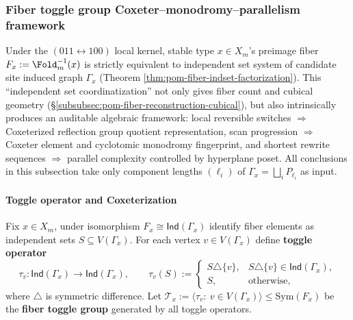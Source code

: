 \subsubsection{Fiber toggle group Coxeter--monodromy--parallelism framework}\label{subsubsec:pom-fiber-toggle-coxeter-monodromy-parallelism}
Under the \((011\leftrightarrow 100)\) local kernel, stable type \(x\in X_m\)'s preimage fiber
\(
F_x:=\Fold_m^{-1}(x)
\)
is strictly equivalent to independent set system of candidate site induced graph \(\Gamma_x\) (Theorem \ref{thm:pom-fiber-indset-factorization}).
This ``independent set coordinatization'' not only gives fiber count and cubical geometry (\S\ref{subsubsec:pom-fiber-reconstruction-cubical}), but also intrinsically produces an auditable algebraic framework:
local reversible switches \(\Rightarrow\) Coxeterized reflection group quotient representation, scan progression \(\Rightarrow\) Coxeter element and cyclotomic monodromy fingerprint,
and shortest rewrite sequences \(\Rightarrow\) parallel complexity controlled by hyperplane poset.
All conclusions in this subsection take only component lengths \((\ell_i)\) of \(\Gamma_x=\bigsqcup_i P_{\ell_i}\) as input.

\paragraph{Toggle operator and Coxeterization}

\begin{definition}\label{def:pom-fiber-toggle-group}
Fix \(x\in X_m\), under isomorphism \(F_x\cong \mathsf{Ind}(\Gamma_x)\) identify fiber elements as independent sets \(S\subseteq V(\Gamma_x)\).
For each vertex \(v\in V(\Gamma_x)\) define \textbf{toggle operator}
\[
\tau_v:\mathsf{Ind}(\Gamma_x)\to \mathsf{Ind}(\Gamma_x),
\qquad
\tau_v(S):=
\begin{cases}
S\triangle\{v\},& S\triangle\{v\}\in \mathsf{Ind}(\Gamma_x),\\
S,& \text{otherwise},
\end{cases}
\]
where \(\triangle\) is symmetric difference.
Let \(\mathcal T_x:=\langle \tau_v:\ v\in V(\Gamma_x)\rangle\le \mathrm{Sym}(F_x)\) be the \textbf{fiber toggle group} generated by all toggle operators.
\end{definition}


